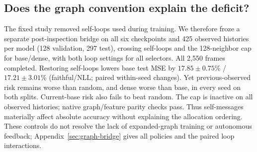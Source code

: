 \subsection{Does the graph convention explain the deficit?}
The fixed study removed self-loops used during training. We therefore froze a
separate post-inspection bridge on all six checkpoints and 425 observed
histories per model (128 validation, 297 test), crossing self-loops and the
128-neighbor cap for base/dense, with both loop settings for all selectors.
All 2,550 frames completed. Restoring self-loops lowers base test MSE by
$17.85\pm0.75$\% / $17.21\pm3.01$\%
(faithful/NLL; paired within-seed changes).
Yet previous-observed risk remains worse than random, and dense worse than base,
in every seed on both splits. Current-base risk also fails to beat random.
The cap is inactive on all observed histories; native graph/feature parity
checks pass. Thus self-messages materially affect absolute accuracy without
explaining the allocation ordering. These controls do not resolve the lack of
expanded-graph training or autonomous feedback; Appendix~\ref{sec:graph-bridge}
gives all policies and the paired loop interactions.
